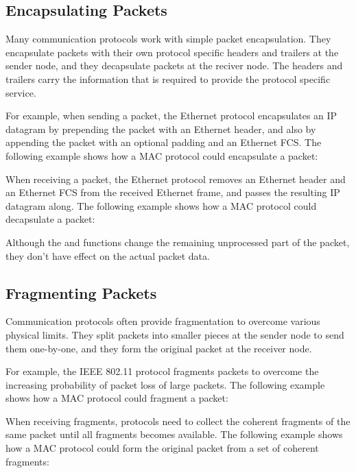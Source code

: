\subsection{Encapsulating Packets}

Many communication protocols work with simple packet encapsulation. They encapsulate packets with their own protocol specific headers and trailers at the sender node, and they decapsulate packets at the reciver node. The headers and trailers carry the information that is required to provide the protocol specific service.

For example, when sending a packet, the Ethernet protocol encapsulates an IP datagram by prepending the packet with an Ethernet header, and also by appending the packet with an optional padding and an Ethernet FCS. The following example shows how a MAC protocol could encapsulate a packet:


When receiving a packet, the Ethernet protocol removes an Ethernet header and an Ethernet FCS from the received Ethernet frame, and passes the resulting IP datagram along. The following example shows how a MAC protocol could decapsulate a packet:


Although the  and  functions change the remaining unprocessed part of the packet, they don't have effect on the actual packet data.

\subsection{Fragmenting Packets}

Communication protocols often provide fragmentation to overcome various physical limits. They split packets into smaller pieces at the sender node to send them one-by-one, and they form the original packet at the receiver node.

For example, the IEEE 802.11 protocol fragments packets to overcome the increasing probability of packet loss of large packets. The following example shows how a MAC protocol could fragment a packet:


When receiving fragments, protocols need to collect the coherent fragments of the same packet until all fragments becomes available. The following example shows how a MAC protocol could form the original packet from a set of coherent fragments:

